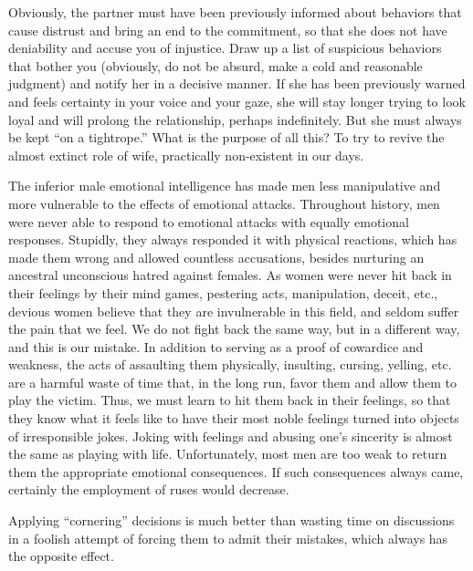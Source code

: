 \par Obviously, the partner must have been previously informed about behaviors that cause distrust and bring an end to the commitment, so that she does not have deniability and accuse you of injustice. Draw up a list of suspicious behaviors that bother you (obviously, do not be absurd, make a cold and reasonable judgment) and notify her in a decisive manner. If she has been previously warned and feels certainty in your voice and your gaze, she will stay longer trying to look loyal and will prolong the relationship, perhaps indefinitely. But she must always be kept \enquote{on a tightrope.} What is the purpose of all this? To try to revive the almost extinct role of wife, practically non-existent in our days.

\par The inferior male emotional intelligence has made men less manipulative and more vulnerable to the effects of emotional attacks. Throughout history, men were never able to respond to emotional attacks with equally emotional responses. Stupidly, they always responded it with physical reactions, which has made them wrong and allowed countless accusations, besides nurturing an ancestral unconscious hatred against females. As women were never hit back in their feelings by their mind games, pestering acts, manipulation, deceit, etc., devious women believe that they are invulnerable in this field, and seldom suffer the pain that we feel. We do not fight back the same way, but in a different way, and this is our mistake. In addition to serving as a proof of cowardice and weakness, the acts of assaulting them physically, insulting, cursing, yelling, etc. are a harmful waste of time that, in the long run, favor them and allow them to play the victim. Thus, we must learn to hit them back in their feelings, so that they know what it feels like to have their most noble feelings turned into objects of irresponsible jokes. Joking with feelings and abusing one's sincerity is almost the same as playing with life\footnotemark[26]. Unfortunately, most men are too weak to return them the appropriate emotional consequences. If such consequences always came, certainly the employment of ruses would decrease.


\par Applying \enquote{cornering} decisions is much better than wasting time on discussions in a foolish attempt of forcing them to admit their mistakes, which always has the opposite effect.